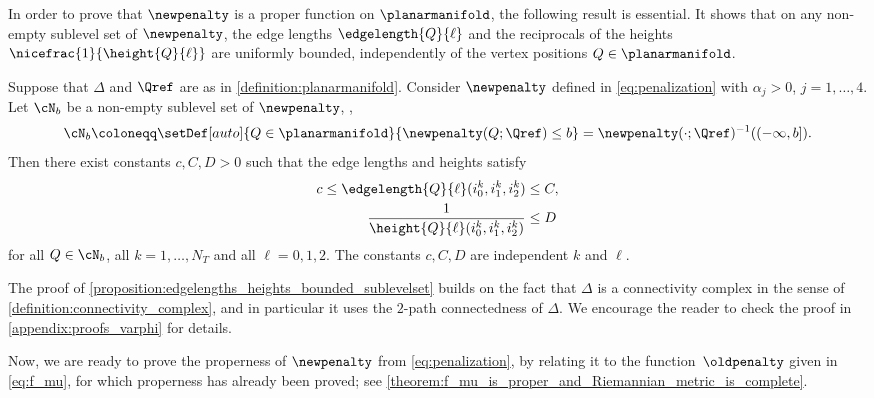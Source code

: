 In order to prove that $\newpenalty$ is a proper function on $\planarmanifold$, the following result is essential.
It shows that on any non-empty sublevel set of $\newpenalty$, the edge lengths $\edgelength{Q}{\ell}$ and the reciprocals of the heights $\nicefrac{1}{\height{Q}{\ell}}$ are uniformly bounded, independently of the vertex positions $Q \in \planarmanifold$.
\begin{proposition}
	\label{proposition:edgelengths_heights_bounded_sublevelset}
	Suppose that $\Delta$ and $\Qref$ are as in \cref{definition:planarmanifold}.
	Consider $\newpenalty$ defined in \eqref{eq:penalization} with $\alpha_j > 0$, $j = 1,\ldots,4$.
	Let $\cN_b$ be a non-empty sublevel set of $\newpenalty$, \ie,
	\begin{equation}
		\label{eq:sublevel_set}
		\cN_b
		\coloneqq
		\setDef[auto]{Q \in \planarmanifold}{\newpenalty(Q;\Qref) \le b}
		=
		\newpenalty(\cdot;\Qref)^{-1}((-\infty,b])
		.
	\end{equation}
	Then there exist constants $c, C, D > 0$ such that the edge lengths and heights satisfy
	\begin{align}
		\label{eq:bounded_edge_lengths}
		c
		\le
		\edgelength{Q}{\ell}(i_0^k,i_1^k,i_2^k)
		&
		\le
		C
		,
		\\
		\label{eq:bounded_reciprocal_heights}
		\frac{1}{\height{Q}{\ell}(i_0^k,i_1^k,i_2^k)}
		&
		\le
		D
	\end{align}
	for all $Q \in \cN_b$, all $k = 1,\ldots,N_T$ and all $\ell = 0,1,2$.
	The constants $c, C, D$ are independent $k$ and $\ell$.
\end{proposition}

The proof of \cref{proposition:edgelengths_heights_bounded_sublevelset} builds on the fact that $\Delta$ is a connectivity complex in the sense of \cref{definition:connectivity_complex}, and in particular it uses the $2$-path connectedness of $\Delta$.
We encourage the reader to check the proof in \cref{appendix:proofs_varphi} for details.

Now, we are ready to prove the properness of $\newpenalty$ from \eqref{eq:penalization}, by relating it to the function~$\oldpenalty$ given in \eqref{eq:f_mu}, for which properness has already been proved; see \cref{theorem:f_mu_is_proper_and_Riemannian_metric_is_complete}.

